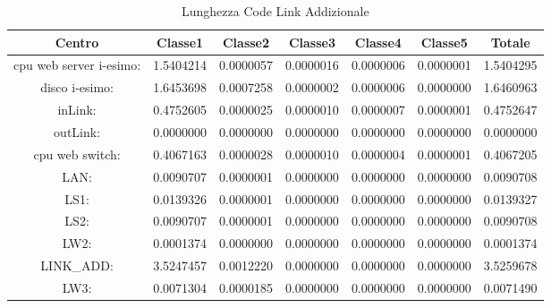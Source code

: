 \begin{table}[H]
\begin{center}\begin{scriptsize}
\begin{tabular}{||c|c|c|c|c|c|c||}
\hline
Centro &Classe1 &Classe2 &Classe3 &Classe4 &Classe5 &Totale\\
\hline
\hline
 cpu web server i-esimo: 	&1.5404214	&0.0000057	&0.0000016	&0.0000006	&0.0000001	&1.5404295\\
\hline
 disco i-esimo: 	&1.6453698	&0.0007258	&0.0000002	&0.0000006	&0.0000000	&1.6460963\\
\hline
 inLink: 	&0.4752605	&0.0000025	&0.0000010	&0.0000007	&0.0000001	&0.4752647\\
\hline
 outLink: 	&0.0000000	&0.0000000	&0.0000000	&0.0000000	&0.0000000	&0.0000000\\
\hline
 cpu web switch: 	&0.4067163	&0.0000028	&0.0000010	&0.0000004	&0.0000001	&0.4067205\\
\hline
 LAN: 	&0.0090707	&0.0000001	&0.0000000	&0.0000000	&0.0000000	&0.0090708\\
\hline
 LS1: 	&0.0139326	&0.0000001	&0.0000000	&0.0000000	&0.0000000	&0.0139327\\
\hline
 LS2: 	&0.0090707	&0.0000001	&0.0000000	&0.0000000	&0.0000000	&0.0090708\\
\hline
 LW2: 	&0.0001374	&0.0000000	&0.0000000	&0.0000000	&0.0000000	&0.0001374\\
\hline
 LINK\_ADD: 	&3.5247457	&0.0012220	&0.0000000	&0.0000000	&0.0000000	&3.5259678\\
\hline
 LW3: 	&0.0071304	&0.0000185	&0.0000000	&0.0000000	&0.0000000	&0.0071490\\
\hline
\end{tabular}
\end{scriptsize}\end{center}
\caption{Lunghezza Code Link Addizionale}
\label{lunghezzacode}
\end{table}

